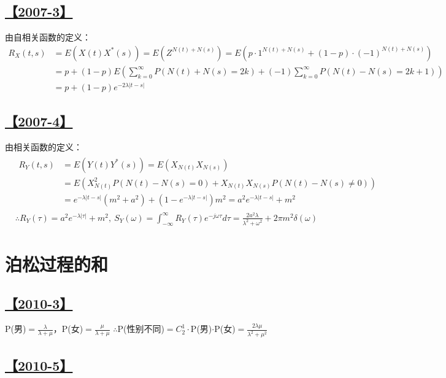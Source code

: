 \subsection{\hyperref[Q2007-3]{【2007-3】}}\label{A2007-3}
由自相关函数的定义：
\begin{equation}\tag*{}
\begin{split}
R_X(t, s)&=E(X(t)X^*(s))=E(Z^{N(t)+N(s)})=E(p\cdot 1^{N(t)+N(s)}+(1-p)\cdot(-1)^{N(t)+N(s)})\\
&=p+(1-p)E\left(\sum_{k=0}^{\infty}P(N(t)+N(s)=2k)+(-1)\sum_{k=0}^{\infty}P(N(t)-N(s)=2k+1)\right)\\
&=p+(1-p)e^{-2\lambda|t-s|}
\end{split}
\end{equation}

\subsection{\hyperref[Q2007-4]{【2007-4】}}\label{A2007-4}
由相关函数的定义：
\begin{equation}\tag*{}
\begin{split}
&\begin{split}
R_Y(t, s)&=E(Y(t)Y^*(s))=E(X_{N(t)}X_{N(s)})\\&=E(X^2_{N(t)}P(N(t)-N(s)=0)+X_{N(t)}X_{N(s)}P(N(t)-N(s)\neq0))\\
&=e^{-\lambda|t-s|}(m^2+a^2)+(1-e^{-\lambda|t-s|})m^2=a^2e^{-\lambda|t-s|}+m^2
\end{split}\\
&\therefore R_Y(\tau)=a^2e^{-\lambda|\tau|}+m^2,\ S_Y(\omega)=\int_{-\infty}^{\infty}R_Y(\tau)e^{-j\omega\tau}d\tau=\frac{2a^2\lambda}{\lambda^2+\omega^2}+2\pi m^2\delta(\omega)
\end{split}
\end{equation}

\section{泊松过程的和}

\subsection{\hyperref[Q2010-3]{【2010-3】}}\label{A2010-3}

P(男)$=\frac{\lambda}{\lambda+\mu}$，P(女)$=\frac{\mu}{\lambda+\mu}$
$\therefore $P(性别不同)$=C_2^1\cdot$P(男)$\cdot$P(女)$=\frac{2\lambda\mu}{\lambda^2+\mu^2}$

\subsection{\hyperref[Q2010-5]{【2010-5】}}\label{A2010-5}

